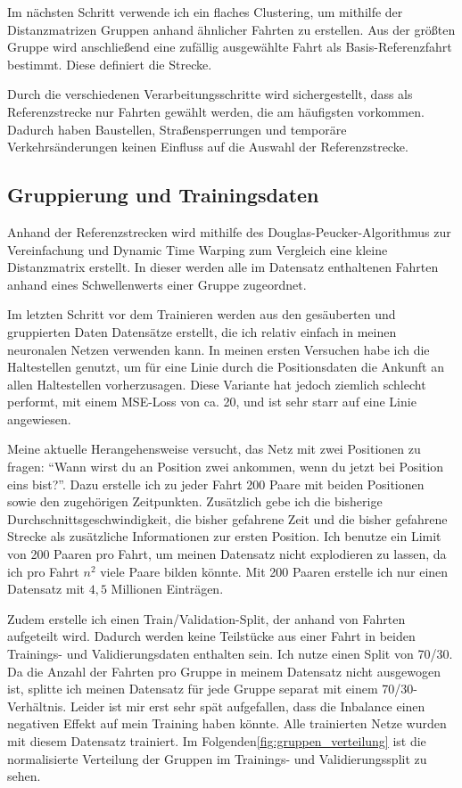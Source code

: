 \documentclass[a4paper]{article}
\begin{document}
    Im nächsten Schritt verwende ich ein flaches Clustering\cite{modernhierachical}, um mithilfe der Distanzmatrizen
    Gruppen anhand ähnlicher Fahrten zu erstellen. Aus der größten Gruppe wird anschließend eine zufällig ausgewählte
    Fahrt als Basis-Referenzfahrt bestimmt. Diese definiert die Strecke.

    Durch die verschiedenen Verarbeitungsschritte wird sichergestellt, dass als Referenzstrecke nur Fahrten gewählt
    werden, die am häufigsten vorkommen. Dadurch haben Baustellen, Straßensperrungen und temporäre Verkehrsänderungen
    keinen Einfluss auf die Auswahl der Referenzstrecke.

    \subsection{Gruppierung und Trainingsdaten}
    \label{subsec:gruppierung}

    Anhand der Referenzstrecken wird mithilfe des Douglas-Peucker-Algorithmus\cite{douglaspeucker} zur Vereinfachung
    und Dynamic Time Warping\cite{dtw} zum Vergleich eine kleine Distanzmatrix erstellt. In dieser werden alle im
    Datensatz enthaltenen Fahrten anhand eines Schwellenwerts einer Gruppe zugeordnet.

    Im letzten Schritt vor dem Trainieren werden aus den gesäuberten und gruppierten Daten Datensätze erstellt, die ich
    relativ einfach in meinen neuronalen Netzen verwenden kann. In meinen ersten Versuchen habe ich die Haltestellen
    genutzt, um für eine Linie durch die Positionsdaten die Ankunft an allen Haltestellen vorherzusagen. Diese Variante
    hat jedoch ziemlich schlecht performt, mit einem MSE-Loss von ca. 20, und ist sehr starr auf eine Linie angewiesen.

    Meine aktuelle Herangehensweise versucht, das Netz mit zwei Positionen zu fragen: \enquote{Wann wirst du an Position
    zwei ankommen, wenn du jetzt bei Position eins bist?}. Dazu erstelle ich zu jeder Fahrt 200 Paare mit beiden
    Positionen sowie den zugehörigen Zeitpunkten. Zusätzlich gebe ich die bisherige Durchschnittsgeschwindigkeit, die
    bisher gefahrene Zeit und die bisher gefahrene Strecke als zusätzliche Informationen zur ersten Position. Ich
    benutze ein Limit von 200 Paaren pro Fahrt, um meinen Datensatz nicht explodieren zu lassen, da ich pro Fahrt
    $n^2$ viele Paare bilden könnte. Mit 200 Paaren erstelle ich nur einen Datensatz mit $4,5$ Millionen Einträgen.

    
    Zudem erstelle ich einen Train/Validation-Split, der anhand von Fahrten aufgeteilt wird. Dadurch werden keine 
    Teilstücke aus einer Fahrt in beiden Trainings- und Validierungsdaten enthalten sein. Ich nutze einen Split von 
    70/30. Da die Anzahl der Fahrten pro Gruppe in meinem Datensatz nicht ausgewogen ist, splitte ich meinen Datensatz 
    für jede Gruppe separat mit einem 70/30-Verhältnis. Leider ist mir erst sehr spät aufgefallen, dass die Inbalance 
    einen negativen Effekt auf mein Training haben könnte. Alle trainierten Netze wurden mit diesem Datensatz trainiert. 
    Im Folgenden\ref{fig:gruppen_verteilung} ist die normalisierte Verteilung der Gruppen im Trainings- und
    Validierungssplit zu sehen.
    
\end{document}
